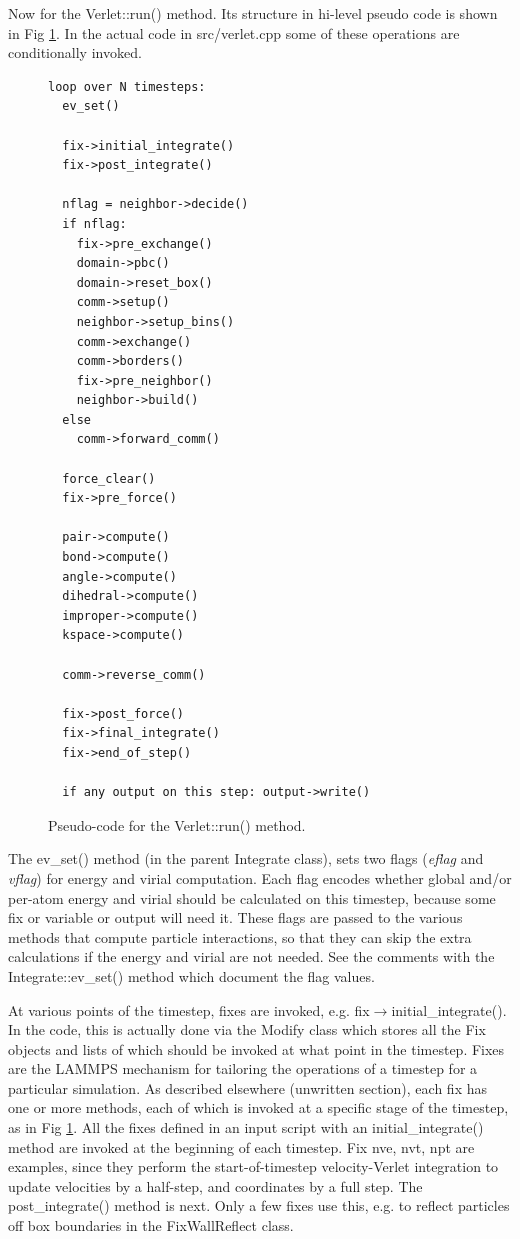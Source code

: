 \documentclass{article}
\begin{document}
Now for the Verlet::run() method.  Its structure in hi-level pseudo
code is shown in Fig \ref{fig:verlet}.  In the actual code in
src/verlet.cpp some of these operations are conditionally invoked.

\begin{figure}[htb]
 \begin{center}
 \begin{verbatim}
loop over N timesteps:
  ev_set()

  fix->initial_integrate()
  fix->post_integrate()

  nflag = neighbor->decide()
  if nflag:
    fix->pre_exchange()
    domain->pbc()
    domain->reset_box()
    comm->setup()
    neighbor->setup_bins()
    comm->exchange()
    comm->borders()
    fix->pre_neighbor()
    neighbor->build()
  else
    comm->forward_comm()

  force_clear()
  fix->pre_force()

  pair->compute()
  bond->compute()
  angle->compute()
  dihedral->compute()
  improper->compute()
  kspace->compute()

  comm->reverse_comm()

  fix->post_force()
  fix->final_integrate()
  fix->end_of_step()

  if any output on this step: output->write()
  \end{verbatim}
 \end{center}
 \caption{Pseudo-code for the Verlet::run() method.}
\label{fig:verlet}
\end{figure}

The ev\_set() method (in the parent Integrate class), sets two flags
({\em eflag} and {\em vflag}) for energy and virial computation.  Each
flag encodes whether global and/or per-atom energy and virial should
be calculated on this timestep, because some fix or variable or output
will need it.  These flags are passed to the various methods that
compute particle interactions, so that they can skip the extra
calculations if the energy and virial are not needed.  See the
comments with the Integrate::ev\_set() method which document the flag
values.

At various points of the timestep, fixes are invoked,
e.g. fix$\rightarrow$initial\_integrate().  In the code, this is
actually done via the Modify class which stores all the Fix objects
and lists of which should be invoked at what point in the timestep.
Fixes are the LAMMPS mechanism for tailoring the operations of a
timestep for a particular simulation.  As described elsewhere
(unwritten section), each fix has one or more methods, each of which
is invoked at a specific stage of the timestep, as in Fig
\ref{fig:verlet}.  All the fixes defined in an input script with an
initial\_integrate() method are invoked at the beginning of each
timestep.  Fix nve, nvt, npt are examples, since they perform the
start-of-timestep velocity-Verlet integration to update velocities by
a half-step, and coordinates by a full step.  The post\_integrate()
method is next.  Only a few fixes use this, e.g. to reflect particles
off box boundaries in the FixWallReflect class.
\end{document}
